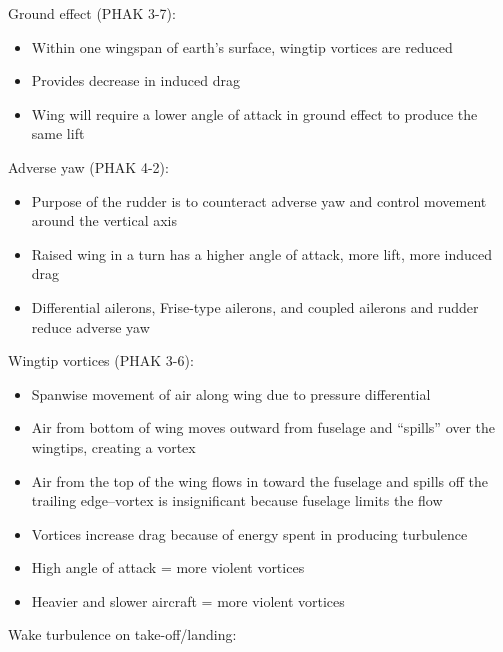 \documentclass[twoside,openright]{report}
\begin{document}
Ground effect (PHAK 3-7):

\begin{itemize}
  \item Within one wingspan of earth’s surface, wingtip vortices are reduced

  \item Provides decrease in induced drag

  \item Wing will require a lower angle of attack in ground effect to produce
    the same lift
\end{itemize}

Adverse yaw (PHAK 4-2):

\begin{itemize}
  \item Purpose of the rudder is to counteract adverse yaw and control movement
    around the vertical axis

  \item Raised wing in a turn has a higher angle of attack, more lift, more
    induced drag

  \item Differential ailerons, Frise-type ailerons, and coupled ailerons and
    rudder reduce adverse yaw
\end{itemize}


Wingtip vortices (PHAK 3-6):

\begin{itemize}
    \item Spanwise movement of air along wing due to pressure differential

    \item Air from bottom of wing moves outward from fuselage and ``spills''
      over the wingtips, creating a vortex

    \item Air from the top of the wing flows in toward the fuselage and spills
      off the trailing edge--vortex is insignificant because fuselage limits the
      flow

    \item Vortices increase drag because of energy spent in producing turbulence

    \item High angle of attack = more violent vortices

    \item Heavier and slower aircraft = more violent vortices
\end{itemize}

Wake turbulence on take-off/landing:
\end{document}
